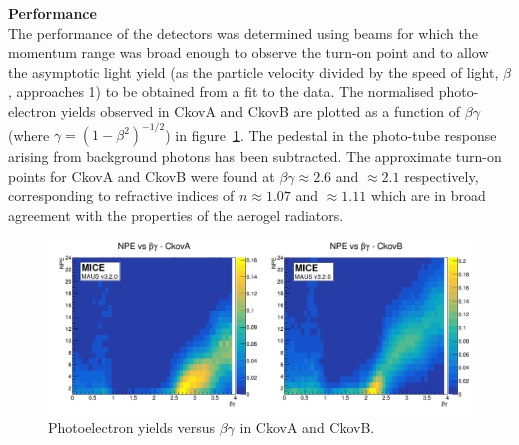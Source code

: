 \noindent\textbf{Performance} \\
\noindent
The performance of the detectors was determined using beams for which
the momentum range was broad enough to observe the turn-on point and to
allow the asymptotic light yield (as the particle velocity divided by the speed of light, $\beta$, approaches 1) to be
obtained from a fit to the data.
The normalised photo-electron yields observed in CkovA and CkovB are
plotted as a function of $\beta\gamma$ (where $\gamma=(1-\beta^2)^{-1/2}$) in
figure~\ref{fig:ckov_betagamma}.
The pedestal in the photo-tube response arising from background
photons has been subtracted.
The approximate turn-on points for CkovA and CkovB were found at
$\beta\gamma \approx 2.6$ and $\approx 2.1$ respectively,
corresponding to refractive indices of $n \approx 1.07$ and $\approx 1.11$ which are in broad agreement with the
properties of the aerogel radiators. 
\begin{figure}
  \begin{center}
    \includegraphics[width=0.90\columnwidth]{./03-Ckov/Figures/scatter_betagamma_logo.png}
    \caption{Photoelectron yields versus $\beta\gamma$ in CkovA and CkovB.}
    \label{fig:ckov_betagamma}
  \end{center}
\end{figure}
